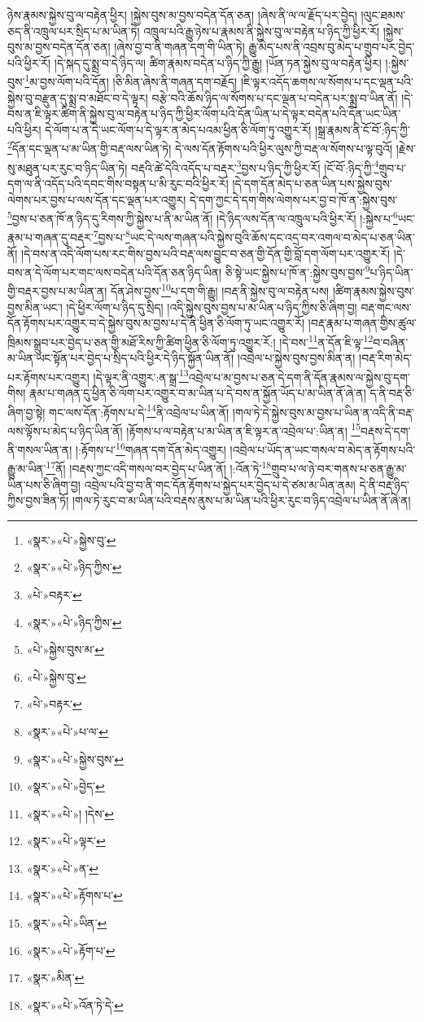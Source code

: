 ཉེས་རྣམས་སྐྱེས་བུ་ལ་བརྟེན་ཕྱིར། །སྐྱེས་བུས་མ་བྱས་བདེན་དོན་ཅན། །ཞེས་ནི་ལ་ལ་རྗོད་པར་བྱེད། །ལུང་ཐམས་ཅད་ནི་འཁྲུལ་པར་སྲིད་པ་མ་ཡིན་ཏེ། འཁྲུལ་པའི་རྒྱུ་ཉེས་པ་རྣམས་ནི་སྐྱེས་བུ་ལ་བརྟེན་པ་ཉིད་ཀྱི་ཕྱིར་རོ། །སྐྱེས་བུས་མ་བྱས་བདེན་དོན་ཅན། །ཞེས་བྱ་བ་ནི་གཞན་དག་གི་ཡིན་ཏེ། རྒྱུ་མེད་པས་ནི་འབྲས་བུ་མེད་པ་གྲུབ་པར་བྱེད་པའི་ཕྱིར་རོ། །དེ་སྐད་དུ་སྨྲ་བ་དེ་ཉིད་ལ། ཚིག་རྣམས་བདེན་པ་ཉིད་ཀྱི་རྒྱུ། །ཡོན་ཏན་སྐྱེས་བུ་ལ་བརྟེན་ཕྱིར། །:སྐྱེས་བུས་\footnote{«སྣར་»«པེ་»སྐྱེས་བུ་}མ་བྱས་ལོག་པའི་དོན། །ཅི་མིན་ཞེས་ནི་གཞན་དག་བརྗོད། །ཇི་ལྟར་འདོད་ཆགས་ལ་སོགས་པ་དང་ལྡན་པའི་སྐྱེས་བུ་བརྫུན་དུ་སྨྲ་བ་མཐོང་བ་དེ་ལྟར། བརྩེ་བའི་ཆོས་ཉིད་ལ་སོགས་པ་དང་ལྡན་པ་བདེན་པར་སྨྲ་བ་ཡིན་ནོ། །དེ་བས་ན་ཇི་ལྟར་ཚིག་ནི་སྐྱེས་བུ་ལ་བརྟེན་པ་ཉིད་ཀྱི་ཕྱིར་ལོག་པའི་དོན་ཡིན་པ་དེ་ལྟར་བདེན་པའི་དོན་ཡང་ཡིན་པའི་ཕྱིར། དེ་ལོག་པ་ན་དེ་ཡང་ལོག་པ་དེ་ལྟར་ན་མེད་པའམ་ཕྱིན་ཅི་ལོག་ཏུ་འགྱུར་རོ། །སྒྲ་རྣམས་ནི་ངོ་བོ་:ཉིད་ཀྱི་\footnote{«སྣར་»«པེ་»ཉིད་ཀྱིས་}དོན་དང་ལྡན་པ་མ་ཡིན་གྱི་བརྡ་ལས་ཡིན་ཏེ། དེ་ལས་དོན་རྟོགས་པའི་ཕྱིར་ལུས་ཀྱི་བརྡ་ལ་སོགས་པ་ལྟ་བུའོ། །རྗེས་སུ་མཐུན་པར་རུང་བ་ཉིད་ཡིན་ཏེ། བརྡའི་ཚེ་དེའི་འདོད་པ་བརྡར་\footnote{«པེ་»བརྟར་}བྱས་པ་ཉིད་ཀྱི་ཕྱིར་རོ། །ངོ་བོ་:ཉིད་ཀྱི་\footnote{«སྣར་»«པེ་»ཉིད་ཀྱིས་}གྲུབ་པ་དག་ལ་ནི་འདོད་པའི་དབང་གིས་བསྟན་པ་མི་རུང་བའི་ཕྱིར་རོ། །དེ་དག་དོན་མེད་པ་ཅན་ཡིན་པས་སྐྱེས་བུས་ལེགས་པར་བྱས་པ་ལས་དོན་དང་ལྡན་པར་འགྱུར། དེ་དག་ཀྱང་དེ་དག་གིས་ལེགས་པར་བྱ་བ་ཁོ་ན་:སྐྱེས་བུས་\footnote{«པེ་»སྐྱེས་བུས་མ་}བྱས་པ་ཅན་ཁོ་ན་ཉིད་དུ་རིགས་ཀྱི་སྐྱེས་པ་ནི་མ་ཡིན་ནོ། །དེ་ཉིད་ལས་དོན་ལ་འཁྲུལ་པའི་ཕྱིར་རོ། །:སྐྱེས་པ་\footnote{«པེ་»སྐྱེས་བུ་}ཡང་རྣམ་པ་གཞན་དུ་བརྡར་\footnote{«པེ་»བརྟར་}བྱས་པ་\footnote{«སྣར་»«པེ་»པ་ལ་}ཡང་དེ་ལས་གཞན་པའི་སྐྱེས་བུའི་ཆོས་དང་འདྲ་བར་འགལ་བ་མེད་པ་ཅན་ཡིན་ནོ། །དེ་བས་ན་འདི་ལོག་པས་རང་གིས་བྱས་པའི་བརྡ་ལས་བྱུང་བ་ཅན་གྱི་དོན་གྱི་བློ་དག་ལོག་པར་འགྱུར་རོ། །དེ་བས་ན་དེ་ལོག་པར་གང་ལས་བདེན་པའི་དོན་ཅན་ཉིད་ཡིན། ཅི་སྟེ་ཡང་སྐྱེས་པ་ཁོ་ན་:སྐྱེས་བུས་བྱས་\footnote{«སྣར་»«པེ་»སྐྱེས་བུས་}པ་ཉིད་ཡིན་གྱི་བརྡར་བྱས་པ་མ་ཡིན་ན། དོན་ཤེས་བྱས་\footnote{«སྣར་»«པེ་»བྱེད་}པ་དག་གི་རྒྱུ། །བརྡ་ནི་སྐྱེས་བུ་ལ་བརྟེན་པས། །ཚིག་རྣམས་སྐྱེས་བུས་བྱས་མིན་ཡང་། །དེ་ཕྱིར་ལོག་པ་ཉིད་དུ་སྲིད། །འདི་སྐྱེས་བུས་བྱས་པ་མ་ཡིན་པ་ཉིད་ཀྱིས་ཅི་ཞིག་བྱ། བརྡ་གང་ལས་དོན་རྟོགས་པར་འགྱུར་བ་དེ་སྐྱེས་བུས་མ་བྱས་པ་དེ་ནི་ཕྱིན་ཅི་ལོག་ཏུ་ཡང་འགྱུར་རོ། །བརྡ་རྣམ་པ་གཞན་གྱིས་ཚུལ་ཁྲིམས་སྒྲུབ་པར་བྱེད་པ་ཅན་གྱི་མཐོ་རིས་ཀྱི་ཚིག་ཕྱིན་ཅི་ལོག་ཏུ་འགྱུར་རོ:། །དེ་བས་\footnote{«སྣར་»«པེ་»། །དེས་}ན་དོན་ཇི་ལྟ་\footnote{«སྣར་»«པེ་»ལྟར་}བ་བཞིན་མ་ཡིན་ཡང་སྟོན་པར་བྱེད་པ་སྲིད་པའི་ཕྱིར་དེ་ཉིད་སྐྱོན་ཡིན་ནོ། །འབྲེལ་པ་སྐྱེས་བུས་བྱས་མིན་ན། །བརྡ་རིག་མེད་པར་རྟོགས་པར་འགྱུར། །དེ་ལྟར་ནི་འགྱུར་:ན་སྒྲ་\footnote{«སྣར་»«པེ་»ན་}འབྲེལ་པ་མ་བྱས་པ་ཅན་དེ་དག་ནི་དོན་རྣམས་ལ་སྐྱེས་བུ་དག་གིས། རྣམ་པ་གཞན་དུ་ཕྱིན་ཅི་ལོག་པར་འགྱུར་བ་མ་ཡིན་པ་དེ་བས་ན་སྐྱོན་ཡོད་པ་མ་ཡིན་ནོ་ཞེ་ན། ད་ནི་བརྡ་ཅི་ཞིག་བྱ་སྟེ། གང་ལས་དོན་:རྟོགས་པ་དེ་\footnote{«སྣར་»«པེ་»རྟོགས་པ་}ནི་འབྲེལ་པ་ཡིན་ནོ། །གལ་ཏེ་དེ་སྐྱེས་བུས་མ་བྱས་པ་ཡིན་ན་འདི་ནི་བརྡ་ལས་ལྟོས་པ་མེད་པ་ཉིད་ཡིན་ནོ། །རྟོགས་པ་ལ་བརྟེན་པ་མ་ཡིན་ན་ཇི་ལྟར་ན་འབྲེལ་པ་:ཡིན་ན། \footnote{«སྣར་»«པེ་»ཡིན་}བརྡས་དེ་དག་ནི་གསལ་ཡིན་ན། །:རྟོགས་པ་\footnote{«སྣར་»«པེ་»རྟོག་པ་}གཞན་དག་དོན་མེད་འགྱུར། །འབྲེལ་པ་ཡོད་ན་ཡང་གསལ་བ་མེད་ན་རྟོགས་པའི་རྒྱུ་མ་ཡིན་\footnote{«སྣར་»མིན་}ནོ། །བརྡས་ཀྱང་འདི་གསལ་བར་བྱེད་པ་ཡིན་ནོ། །:འོན་ཏེ་\footnote{«སྣར་»«པེ་»འོན་ཏེ་དེ་}གྲུབ་པ་ལ་ཉེ་བར་གནས་པ་ཅན་རྒྱུ་མ་ཡིན་པས་ཅི་ཞིག་བྱ། འབྲེལ་པའི་བྱ་བ་ནི་གང་དོན་རྟོགས་པ་སྐྱེད་པར་བྱེད་པ་དེ་ཙམ་མ་ཡིན་ནམ། དེ་ནི་བརྡ་ཉིད་ཀྱིས་བྱས་ཟིན་ཏོ། །གལ་ཏེ་རུང་བ་མ་ཡིན་པའི་བརྡས་ནུས་པ་མ་ཡིན་པའི་ཕྱིར་རུང་བ་ཉིད་འབྲེལ་པ་ཡིན་ནོ་ཞེ་ན། 